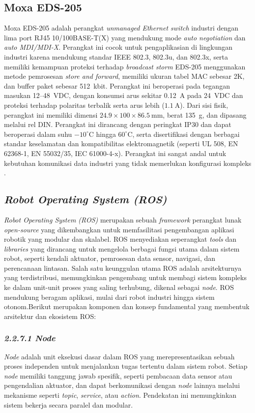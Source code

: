 \subsection{Moxa EDS-205}

Moxa EDS-205 adalah perangkat \emph{unmanaged Ethernet switch} industri dengan lima port RJ45 10/100BASE-T(X) yang mendukung mode \emph{auto negotiation} dan \emph{auto MDI/MDI-X}. Perangkat ini cocok untuk pengaplikasian di lingkungan industri karena mendukung standar IEEE 802.3, 802.3u, dan 802.3x, serta memiliki kemampuan proteksi terhadap \emph{broadcast storm} EDS-205 menggunakan metode pemrosesan \emph{store and forward}, memiliki ukuran tabel MAC sebesar 2K, dan buffer paket sebesar 512~kbit. Perangkat ini beroperasi pada tegangan masukan 12--48~VDC, dengan konsumsi arus sekitar 0.12~A pada 24~VDC dan proteksi terhadap polaritas terbalik serta arus lebih (\(1.1~\text{A}\)). Dari sisi fisik, perangkat ini memiliki dimensi \(24.9 \times 100 \times 86.5~\text{mm}\), berat 135~g, dan dipasang melalui rel DIN. Perangkat ini dirancang dengan peringkat IP30 dan dapat beroperasi dalam suhu \(-10^\circ\text{C}\) hingga \(60^\circ\text{C}\), serta disertifikasi dengan berbagai standar keselamatan dan kompatibilitas elektromagnetik (seperti UL 508, EN 62368-1, EN 55032/35, IEC 61000-4-x). Perangkat ini sangat andal untuk kebutuhan komunikasi data industri yang tidak memerlukan konfigurasi kompleks \cite{moxa_eds205}.

\subsection{\emph{Robot Operating System (ROS)}}

\emph{Robot Operating System (ROS)} merupakan sebuah \emph{framework} perangkat lunak \emph{open-source} yang dikembangkan untuk memfasilitasi pengembangan aplikasi robotik yang modular dan skalabel. ROS menyediakan seperangkat \emph{tools} dan \emph{libraries} yang dirancang untuk mengelola berbagai fungsi utama dalam sistem robot, seperti kendali aktuator, pemrosesan data sensor, navigasi, dan perencanaan lintasan. Salah satu keunggulan utama ROS adalah arsitekturnya yang terdistribusi, memungkinkan pengembang untuk membagi sistem kompleks ke dalam unit-unit proses yang saling terhubung, dikenal sebagai \emph{node}. ROS mendukung beragam aplikasi, mulai dari robot industri hingga sistem otonom.Berikut merupakan komponen dan konsep fundamental yang membentuk arsitektur dan ekosistem ROS:

\subsubsection{\emph{2.2.7.1 Node}}
\emph{Node} adalah unit eksekusi dasar dalam ROS yang merepresentasikan sebuah proses independen untuk menjalankan tugas tertentu dalam sistem robot. Setiap \emph{node} memiliki tanggung jawab spesifik, seperti pembacaan data sensor atau pengendalian aktuator, dan dapat berkomunikasi dengan \emph{node} lainnya melalui mekanisme seperti \emph{topic}, \emph{service}, atau \emph{action}. Pendekatan ini memungkinkan sistem bekerja secara paralel dan modular.


